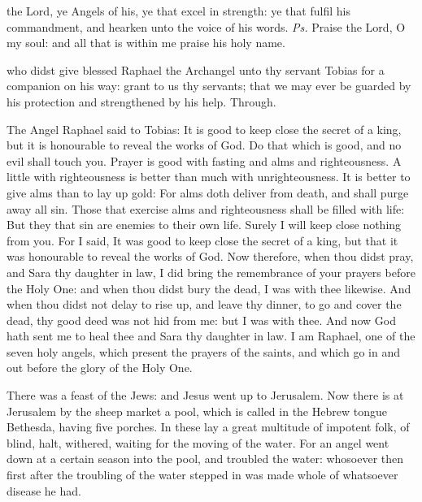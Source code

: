 \introit
{} the Lord, ye Angels of his, ye that excel in strength: ye that fulfil his commandment, and hearken unto the voice of his words. \textit{Ps.} Praise the Lord, O my soul: and all that is within me praise his holy name.

\collect
{} who didst give blessed Raphael the Archangel unto thy servant Tobias for a companion on his way: grant to us thy servants; that we may ever be guarded by his protection and strengthened by his help. Through.

 The Angel Raphael said to Tobias: It is good to keep close the secret of a king, but it is honourable to reveal the works of God. Do that which is good, and no evil shall touch you. Prayer is good with fasting and alms and righteousness. A little with righteousness is better than much with unrighteousness. It is better to give alms than to lay up gold: For alms doth deliver from death, and shall purge away all sin. Those that exercise alms and righteousness shall be filled with life: But they that sin are enemies to their own life. Surely I will keep close nothing from you. For I said, It was good to keep close the secret of a king, but that it was honourable to reveal the works of God. Now therefore, when thou didst pray, and Sara thy daughter in law, I did bring the remembrance of your prayers before the Holy One: and when thou didst bury the dead, I was with thee likewise. And when thou didst not delay to rise up, and leave thy dinner, to go and cover the dead, thy good deed was not hid from me: but I was with thee. And now God hath sent me to heal thee and Sara thy daughter in law. I am Raphael, one of the seven holy angels, which present the prayers of the saints, and which go in and out before the glory of the Holy One.


 There was a feast of the Jews: and Jesus went up to Jerusalem. Now there is at Jerusalem by the sheep market a pool, which is called in the Hebrew tongue Bethesda, having five porches. In these lay a great multitude of impotent folk, of blind, halt, withered, waiting for the moving of the water. For an angel went down at a certain season into the pool, and troubled the water: whosoever then first after the troubling of the water stepped in was made whole of whatsoever disease he had.

